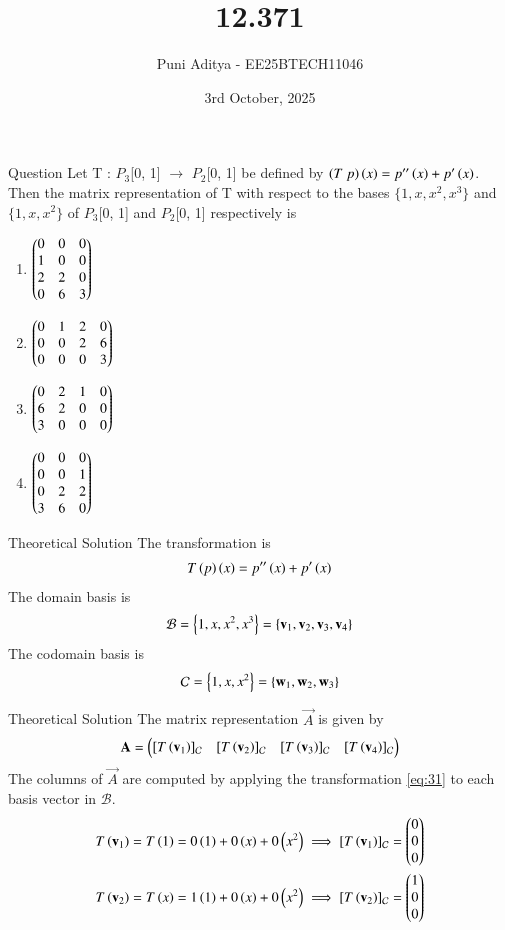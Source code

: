 \documentclass{beamer}
\title{12.371}
\date{3rd October, 2025}
\author{Puni Aditya - EE25BTECH11046}
\begin{document}
\frame{\titlepage}
\begin{frame}{Question}
Let T : $P_3$[0, 1] $\to$ $P_2$[0, 1] be defined by $\left(T\text{  }p\right)\left(x\right) = p''\left(x\right) + p'\left(x\right)$. Then the matrix
representation of T with respect to the bases $\{1, x, x^2, x^3 \}$ and $\{1, x, x^2 \}$ of $P_3$[0, 1]
and $P_2$[0, 1] respectively is
\begin{enumerate}
    \item $\begin{pmatrix}0 & 0 & 0 \\ 1 & 0 & 0 \\ 2 & 2 & 0 \\ 0 & 6 & 3\end{pmatrix}$
    \item $\begin{pmatrix}0 & 1 & 2 & 0 \\ 0 & 0 & 2 & 6 \\ 0 & 0 & 0 & 3\end{pmatrix}$
    \item $\begin{pmatrix}0 & 2 & 1 & 0 \\ 6 & 2 & 0 & 0 \\ 3 & 0 & 0 & 0\end{pmatrix}$
    \item $\begin{pmatrix}0 & 0 & 0 \\ 0 & 0 & 1 \\ 0 & 2 & 2 \\ 3 & 6 & 0\end{pmatrix}$
\end{enumerate}
\end{frame}

\begin{frame}{Theoretical Solution}
The transformation is 
\begin{align}
    T\left(p\right)\left(x\right) = p''\left(x\right) + p'\left(x\right) \label{eq:31}
\end{align}
The domain basis is 
\begin{align}
    \mathcal{B} = \left\{1, x, x^2, x^3\right\} = \left\{\mathbf{v}_1, \mathbf{v}_2, \mathbf{v}_3, \mathbf{v}_4\right\}
\end{align}
The codomain basis is 
\begin{align}
    \mathcal{C} = \left\{1, x, x^2\right\} = \left\{\mathbf{w}_1, \mathbf{w}_2, \mathbf{w}_3\right\}
\end{align}
\end{frame}

\begin{frame}{Theoretical Solution}
The matrix representation $\vec{A}$ is given by
\begin{align}
    \mathbf{A} = \begin{pmatrix} [T\left(\mathbf{v}_1\right)]_\mathcal{C} & [T\left(\mathbf{v}_2\right)]_\mathcal{C} & [T\left(\mathbf{v}_3\right)]_\mathcal{C} & [T\left(\mathbf{v}_4\right)]_\mathcal{C} \end{pmatrix}
\end{align}
The columns of $\vec{A}$ are computed by applying the transformation \eqref{eq:31} to each basis vector in $\mathcal{B}$.
\begin{align}
    T\left(\mathbf{v}_1\right) = T\left(1\right) &= 0\left(1\right) + 0\left(x\right) + 0\left(x^2\right) \implies [T\left(\mathbf{v}_1\right)]_\mathcal{C} = \begin{pmatrix}0 \\ 0 \\ 0\end{pmatrix} \\
    T\left(\mathbf{v}_2\right) = T\left(x\right) &= 1\left(1\right) + 0\left(x\right) + 0\left(x^2\right) \implies [T\left(\mathbf{v}_2\right)]_\mathcal{C} = \begin{pmatrix}1 \\ 0 \\ 0\end{pmatrix}
\end{align}
\end{frame}
\end{document}
